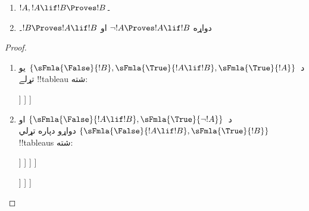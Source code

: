 \documentclass[../../../include/open-logic-section]{subfiles}
\begin{document}
\begin{prop}
  \begin{enumerate}
  \item {}
    $!A, !A \lif !B \Proves !B$۔
  \item {}
    دواړه $\lnot !A \Proves !A \lif !B$ او
    $!B \Proves !A \lif !B$۔
  \end{enumerate}
\end{prop}

\begin{proof}
  \begin{enumerate}
    \item د~$\{\sFmla{\False}{!B}, \sFmla{\True}{!A \lif !B},
      \sFmla{\True}{!A}\}$ يو تړلے !!{tableau} شته:
      \begin{oltableau}
        [\sFmla{\False}{\formula{B}}, just=\TAss
          [\sFmla{\True}{\formula{A} \lif \formula{B}}, just=\TAss
            [\sFmla{\True}{\formula{A}}, just=\TAss
              [\sFmla{\False}{\formula{A}}, just = {\TRule{\True}{\lif}[2]}, close]
              [\sFmla{\True}{\formula{B}}, just = {\TRule{\True}{\lif}[2]}, close]
            ]
          ]
        ]
      \end{oltableau}
    \item د~$\{\sFmla{\False}{!A \lif !B},
      \sFmla{\True}{\lnot !A}\}$ او
      $\{\sFmla{\False}{!A \lif !B}, \sFmla{\True}{!B}\}$ دواړو
      دپاره تړلي !!{tableau}s شته:
      \begin{oltableau}
        [\sFmla{\False}{\formula{A} \lif \formula{B}}, just = \TAss
          [\sFmla{\True}{\lnot \formula{A}}, just = \TAss
            [\sFmla{\True}{\formula{A}}, just = {\TRule{\False}{\lif}[1]}
              [\sFmla{\False}{\formula{B}}, just = {\TRule{\False}{\lif}[1]}
                [\sFmla{\False}{\formula{A}}, just = {\TRule{\True}{\lnot}[2]}, close]
              ]
            ]
          ]
        ]
      \end{oltableau}
      \begin{oltableau}
        [\sFmla{\False}{\formula{A} \lif \formula{B}}, just = \TAss
          [\sFmla{\True}{\formula{B}}, just = \TAss
            [\sFmla{\True}{\formula{A}}, just = {\TRule{\False}{\lif}[1]}
              [\sFmla{\False}{\formula{B}}, just = {\TRule{\False}{\lif}[1]},close
              ]
            ]
          ]
        ]
      \end{oltableau}
  \end{enumerate}
\end{proof}
\end{document}
